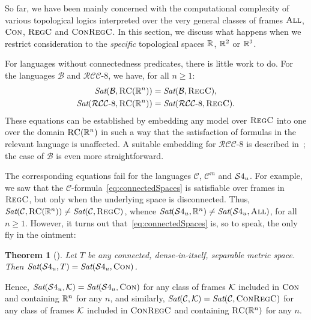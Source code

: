 \documentclass{LMCS}
\theoremstyle{plain}
\newtheorem{theorem}[thm]{Theorem}
\newcommand{\cB}{\ensuremath{\mathcal{B}}}\newcommand{\cBc}{\ensuremath{\mathcal{B}c}}\newcommand{\cBcc}{\ensuremath{\mathcal{B}cc}}
\newcommand{\cBC}{\ensuremath{\mathcal{C}}}
\newcommand{\cBCm}{\ensuremath{\mathcal{C}^m}}
\newcommand{\RCCE}{\ensuremath{\mathcal{RCC}\text{-}8}}\newcommand{\RCCEcc}{\ensuremath{\RCCE{}cc}}\newcommand{\RCCEc}{\ensuremath{\RCCE{}c}}
\newcommand{\Sat}{\textit{Sat}}
\newcommand{\All}{\textsc{All}}
\newcommand{\Regc}{\textsc{RegC}}
\newcommand{\ConR}{\textsc{ConRegC}}
\begin{document}
So far, we have been mainly concerned with the computational complexity of various
topological logics interpreted over the very general classes of frames
$\All$, $\textsc{Con}$, $\Regc$ and $\ConR$. In this section, we discuss
what happens when we restrict consideration to the {\em specific}
topological spaces $\mathbb{R}$, $\mathbb{R}^2$ or $\mathbb{R}^3$.

For languages without connectedness predicates, there is little work
to do. For the languages $\cB$ and $\RCCE$, we have, for all $n \geq
1$:
\begin{align*}
\Sat(\cB, \RegC(\R^n))   &= \Sat(\cB, \Regc),\\
\Sat(\RCCE, \RegC(\R^n)) &= \Sat(\RCCE, \Regc).
\end{align*}
These equations can be established by embedding any model over $\Regc$
into one over the domain $\textsc{RC}(\mathbb{R}^n)$ in such a way that the
satisfaction of formulas in the relevant language is unaffected.  A
suitable embedding for $\RCCE$ is described in~\cite{Renz98}; the case
of $\cB$ is even more straightforward.

The corresponding equations fail for the languages $\cBC$, $\cBCm$ and
$\mathcal{S}4_u$.  For example, we saw that the
$\cBC$-formula~\eqref{eq:connectedSpaces} is satisfiable over
frames in $\Regc$, but only when the underlying space is disconnected.
Thus, $\Sat(\cBC, \RegC(\R^n)) \neq \Sat(\cBC, \Regc)$, whence
$\Sat(\SFU, \R^n) \neq \Sat(\SFU, \All)$, for all $n \geq 1$. However,
it turns out that~\eqref{eq:connectedSpaces} is, so to speak, the only
fly in the ointment:
\begin{theorem}[\cite{Shehtman99}]\label{theo:CalmostInsensitive}
Let $T$ be any connected, dense-in-itself, separable metric space.
Then $\Sat(\SFU, T) = \Sat(\SFU, \Con)$.
\end{theorem}
\noindent
Hence, $\Sat(\SFU, \cK) = \Sat(\SFU, \Con)$ for any class of frames
$\mathcal{K}$ included in $\textsc{Con}$ and containing $\mathbb{R}^n$ for any $n$, and
similarly, $\Sat(\cBC, \cK) = \Sat(\cBC, \ConR)$ for any class of
frames $\mathcal{K}$ included in $\ConR$ and containing $\textsc{RC}(\mathbb{R}^n)$ for any
$n$.
\end{document}
